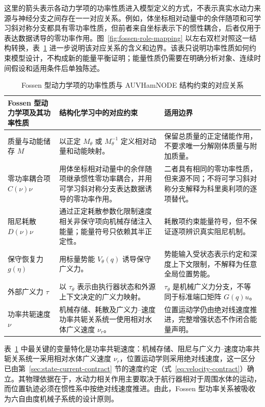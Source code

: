 \documentclass[UTF8,zihao=-4]{ctexrep}
\begin{document}
这里的箭头表示各动力学项的功率性质进入模型定义的方式，不表示真实水动力来源与神经分支之间存在一一对应关系。例如，体坐标相对动量中的余伴随项和可学习斜对称分支都具有零功率性质，但前者来自坐标表示下的惯性耦合，后者仅用于表达数据诱导的零功率作用。图~\ref{fig:fossen-role-mapping} 以左右双栏对照这一结构转换，表~\ref{tab:fossen-to-auvhamnode-roles} 进一步说明该对应关系的含义和边界。该表只说明功率性质如何约束模型设计，不构成新的能量平衡证明；能量性质仍需要在明确分析对象、连续时间假设和适用条件后单独陈述。

\begin{table}[htbp]
  \centering
  \caption{Fossen 型动力学项的功率性质与 AUVHamNODE 结构约束的对应关系}
  \label{tab:fossen-to-auvhamnode-roles}
  \begin{tabularx}{\textwidth}{>{\raggedright\arraybackslash}p{}>{\raggedright\arraybackslash}p{}>{\raggedright\arraybackslash}X}
    \toprule
    Fossen 型动力学项及其功率性质 & 结构化学习中的对应约束 & 适用边界 \\
    \midrule
    质量与动能储存 \(M\) & 以正定 \(M_\theta\) 或 \(M_\theta^{-1}\) 定义相对动量和动能映射。 & 保留总质量的正定储能作用，不要求唯一分解刚体质量与附加质量。 \\
    零功率耦合项 \(C(\nu)\nu\) & 用体坐标相对动量中的余伴随项继承惯性零功率耦合，并用可学习斜对称分支表达数据诱导的零功率作用。 & 二者具有相同的零功率性质，但来源不同；不将可学习斜对称分支解释为科里奥利项的逐项替代。 \\
    阻尼耗散 \(D(\nu)\nu\) & 通过正定耗散参数化限制速度相关非保守项向机械存储注入能量；能量符号只依赖其半正定性。 & 耗散项约束能量符号，但不保证逐项辨识真实阻尼机制。 \\
    保守恢复力 \(g(\eta)\) & 用标量势能 \(V_\theta(q)\) 诱导保守广义力。 & 势能输入受状态表示约定和深度上下文限制，不解释为任意全局位置势能。 \\
    外部广义力 \(\tau\) & 以 \(\tau_\theta\) 表示由执行器状态和外源上下文决定的广义力映射。 & \(\tau_\theta\) 是机械广义力分支，不等同于标准端口矩阵 \(G(q)u\)。 \\
    功率共轭速度 \(\nu\) & 机械存储、耗散及广义力--速度功率共轭关系统一使用相对水体广义速度 \(\nu_r\)。 & 位置运动学仍由绝对线速度推进，完整增强状态不作闭合能量声明。 \\
    \bottomrule
  \end{tabularx}
\end{table}

表~\ref{tab:fossen-to-auvhamnode-roles} 中最关键的变量特化是功率共轭速度：机械存储、阻尼与广义力--速度功率共轭关系统一采用相对水体广义速度 \(\nu_r\)，位置运动学则采用绝对线速度，这一区分已由第~\ref{sec:state-current-contract} 节的速度约定（式~\eqref{eq:velocity-contract}）确立。其物理依据在于，水动力相关作用主要取决于航行器相对于周围水体的运动，而位置轨迹必须在惯性系中按绝对线速度推进。由此，Fossen 型功率关系被吸收为六自由度机械子系统的设计原则。
\end{document}
